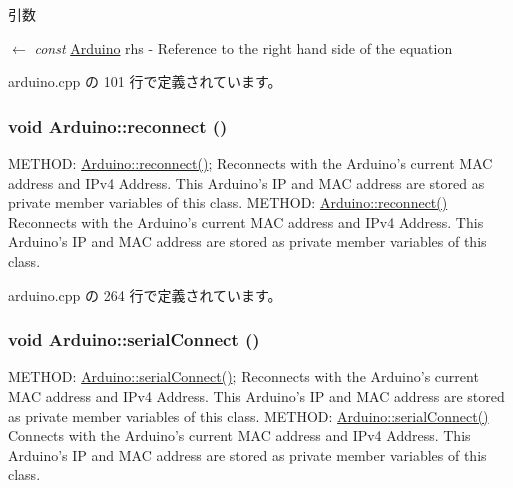 \begin{DoxyParams}{引数}
\item[\mbox{$\leftarrow$} {\em const}]\hyperlink{classArduino}{Arduino} rhs -\/ Reference to the right hand side of the equation \end{DoxyParams}


 arduino.cpp の 101 行で定義されています。\hypertarget{classArduino_afecf95c6c107c1128de23d8b38602e88_afecf95c6c107c1128de23d8b38602e88}{
\subsubsection[{reconnect}]{\setlength{\rightskip}{0pt plus 5cm}void Arduino::reconnect ()}}
\label{classArduino_afecf95c6c107c1128de23d8b38602e88_afecf95c6c107c1128de23d8b38602e88}


METHOD: \hyperlink{classArduino_afecf95c6c107c1128de23d8b38602e88_afecf95c6c107c1128de23d8b38602e88}{Arduino::reconnect()}; Reconnects with the Arduino's current MAC address and IPv4 Address. This Arduino's IP and MAC address are stored as private member variables of this class. METHOD: \hyperlink{classArduino_afecf95c6c107c1128de23d8b38602e88_afecf95c6c107c1128de23d8b38602e88}{Arduino::reconnect()} Reconnects with the Arduino's current MAC address and IPv4 Address. This Arduino's IP and MAC address are stored as private member variables of this class. 

 arduino.cpp の 264 行で定義されています。\hypertarget{classArduino_a34745ece538758a361a16beae91f8619_a34745ece538758a361a16beae91f8619}{
\subsubsection[{serialConnect}]{\setlength{\rightskip}{0pt plus 5cm}void Arduino::serialConnect ()}}
\label{classArduino_a34745ece538758a361a16beae91f8619_a34745ece538758a361a16beae91f8619}


METHOD: \hyperlink{classArduino_a34745ece538758a361a16beae91f8619_a34745ece538758a361a16beae91f8619}{Arduino::serialConnect()}; Reconnects with the Arduino's current MAC address and IPv4 Address. This Arduino's IP and MAC address are stored as private member variables of this class. METHOD: \hyperlink{classArduino_a34745ece538758a361a16beae91f8619_a34745ece538758a361a16beae91f8619}{Arduino::serialConnect()} Connects with the Arduino's current MAC address and IPv4 Address. This Arduino's IP and MAC address are stored as private member variables of this class. 

